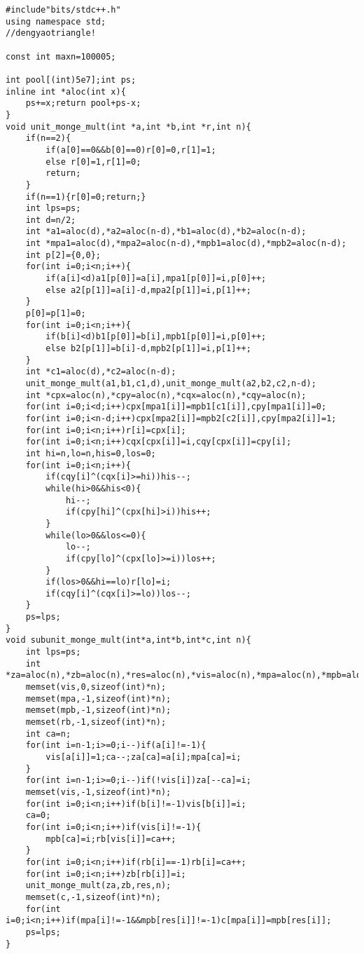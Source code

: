 \documentclass[12pt]{ctexart}
\begin{document}
\begin{lstlisting}
#include"bits/stdc++.h"
using namespace std;
//dengyaotriangle!

const int maxn=100005;

int pool[(int)5e7];int ps;
inline int *aloc(int x){
    ps+=x;return pool+ps-x;
}
void unit_monge_mult(int *a,int *b,int *r,int n){
    if(n==2){
        if(a[0]==0&&b[0]==0)r[0]=0,r[1]=1;
        else r[0]=1,r[1]=0;
        return;
    }
    if(n==1){r[0]=0;return;}
    int lps=ps;
    int d=n/2;
    int *a1=aloc(d),*a2=aloc(n-d),*b1=aloc(d),*b2=aloc(n-d);
    int *mpa1=aloc(d),*mpa2=aloc(n-d),*mpb1=aloc(d),*mpb2=aloc(n-d);
    int p[2]={0,0};
    for(int i=0;i<n;i++){
        if(a[i]<d)a1[p[0]]=a[i],mpa1[p[0]]=i,p[0]++;
        else a2[p[1]]=a[i]-d,mpa2[p[1]]=i,p[1]++;
    }
    p[0]=p[1]=0;
    for(int i=0;i<n;i++){
        if(b[i]<d)b1[p[0]]=b[i],mpb1[p[0]]=i,p[0]++;
        else b2[p[1]]=b[i]-d,mpb2[p[1]]=i,p[1]++;
    }
    int *c1=aloc(d),*c2=aloc(n-d);
    unit_monge_mult(a1,b1,c1,d),unit_monge_mult(a2,b2,c2,n-d);
    int *cpx=aloc(n),*cpy=aloc(n),*cqx=aloc(n),*cqy=aloc(n);
    for(int i=0;i<d;i++)cpx[mpa1[i]]=mpb1[c1[i]],cpy[mpa1[i]]=0;
    for(int i=0;i<n-d;i++)cpx[mpa2[i]]=mpb2[c2[i]],cpy[mpa2[i]]=1;
    for(int i=0;i<n;i++)r[i]=cpx[i];
    for(int i=0;i<n;i++)cqx[cpx[i]]=i,cqy[cpx[i]]=cpy[i];
    int hi=n,lo=n,his=0,los=0;
    for(int i=0;i<n;i++){
        if(cqy[i]^(cqx[i]>=hi))his--;
        while(hi>0&&his<0){
            hi--;
            if(cpy[hi]^(cpx[hi]>i))his++;
        }
        while(lo>0&&los<=0){
            lo--;
            if(cpy[lo]^(cpx[lo]>=i))los++;
        }
        if(los>0&&hi==lo)r[lo]=i;
        if(cqy[i]^(cqx[i]>=lo))los--;
    }
    ps=lps;
}
void subunit_monge_mult(int*a,int*b,int*c,int n){
    int lps=ps;
    int *za=aloc(n),*zb=aloc(n),*res=aloc(n),*vis=aloc(n),*mpa=aloc(n),*mpb=aloc(n),*rb=aloc(n);
    memset(vis,0,sizeof(int)*n);
    memset(mpa,-1,sizeof(int)*n);
    memset(mpb,-1,sizeof(int)*n);
    memset(rb,-1,sizeof(int)*n);
    int ca=n;
    for(int i=n-1;i>=0;i--)if(a[i]!=-1){
        vis[a[i]]=1;ca--;za[ca]=a[i];mpa[ca]=i;
    }
    for(int i=n-1;i>=0;i--)if(!vis[i])za[--ca]=i;
    memset(vis,-1,sizeof(int)*n);
    for(int i=0;i<n;i++)if(b[i]!=-1)vis[b[i]]=i;
    ca=0;
    for(int i=0;i<n;i++)if(vis[i]!=-1){
        mpb[ca]=i;rb[vis[i]]=ca++;
    }
    for(int i=0;i<n;i++)if(rb[i]==-1)rb[i]=ca++;
    for(int i=0;i<n;i++)zb[rb[i]]=i;
    unit_monge_mult(za,zb,res,n);
    memset(c,-1,sizeof(int)*n);
    for(int i=0;i<n;i++)if(mpa[i]!=-1&&mpb[res[i]]!=-1)c[mpa[i]]=mpb[res[i]];
    ps=lps;
}



\end{lstlisting}
\end{document}
